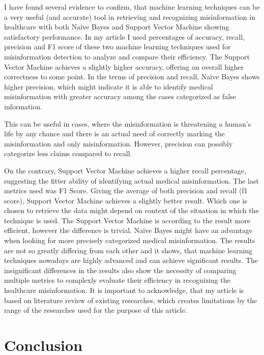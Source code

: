 \documentclass[11pt ,english,a4paper]{article}
\begin{document}
I have found several evidence to confirm, that machine learning techniques can be a very useful (and accurate) tool in retrieving and recognizing misinformation in healthcare with both Naïve Bayes and Support Vector Machine showing satisfactory performance. In my article I used percentages of accuracy, recall, precision and F1 score of these two machine learning techniques used for misinformation detection to analyze and compare their efficiency. 
The Support Vector Machine achieves a slightly higher accuracy, offering an overall higher correctness to some point. In the terms of precision and recall, Naïve Bayes shows higher precision, which might indicate it is able to identify medical misinformation with greater accuracy among the cases categorized as false information. 

This can be useful in cases, where the misinformation is threatening a human's life by any chance and there is an actual need of correctly marking the misinformation and only misinformation. However, precision can possibly categorize less claims compared to recall.

On the contrary, Support Vector Machine achieves a higher recall percentage, suggesting the fitter ability of identifying actual medical misinformation. The last metrics used was F1 Score. Giving the average of both precision and recall (f1 score), Support Vector Machine achieves a slightly better result.
Which one is chosen to retrieve the data might depend on context of the situation in which the technique is used. The Support Vector Machine is according to the result more efficient, however the difference is trivial. Naïve Bayes might have an advantage when looking for more precisely categorized medical misinformation. The results are not so greatly differing from each other and it shows, that machine learning techniques nowadays are highly advanced and can achieve significant results. The insignificant differences in the results also show the necessity of comparing multiple metrics to complexly evaluate their efficiency in recognizing the healthcare misinformation.
It is important to acknowledge, that my article is based on literature review of existing researches, which creates limitations by the range of the researches used for the purpose of this article.

\section{Conclusion}\label{conclusion}
\end{document}
